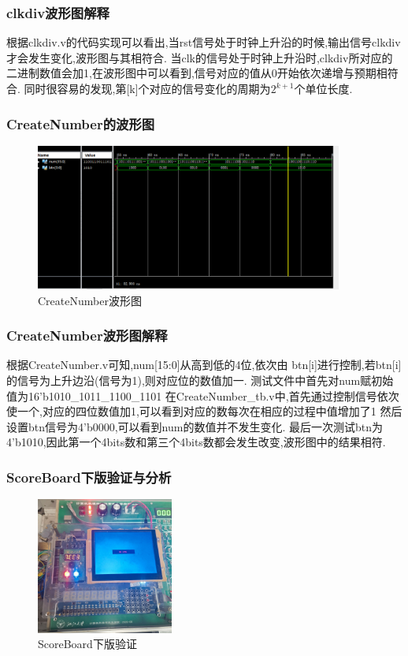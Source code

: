 \documentclass{article}
\begin{document}
\subsubsection*{clkdiv波形图解释}
根据clkdiv.v的代码实现可以看出,当rst信号处于时钟上升沿的时候,输出信号clkdiv才会发生变化,波形图与其相符合.
当clk的信号处于时钟上升沿时,clkdiv所对应的二进制数值会加1,在波形图中可以看到,信号对应的值从0开始依次递增与预期相符合.
同时很容易的发现,第[k]个对应的信号变化的周期为$2^{k+1}$个单位长度.

\subsubsection{CreateNumber的波形图}
    \begin{figure}[H]
    \centering
    \includegraphics[width=0.9\textwidth]{lab7/8.png}
    \caption{\label{Lab7}CreateNumber波形图}
    \end{figure}

\subsubsection*{CreateNumber波形图解释}
根据CreateNumber.v可知,num[15:0]从高到低的4位,依次由 btn[i]进行控制,若btn[i]的信号为上升边沿(信号为1),则对应位的数值加一.
测试文件中首先对num赋初始值为16'b1010\_1011\_1100\_1101
在CreateNumber\_tb.v中,首先通过控制信号依次使一个,对应的四位数值加1,可以看到对应的数每次在相应的过程中值增加了1
然后设置btn信号为4'b0000,可以看到num的数值并不发生变化.
最后一次测试btn为4'b1010,因此第一个4bits数和第三个4bits数都会发生改变,波形图中的结果相符.

\subsubsection{ScoreBoard下版验证与分析}

    \begin{figure}[H]
    \centering
    \includegraphics[width=0.4\textwidth]{lab7/9.jpg}
    \caption{\label{Lab7}ScoreBoard下版验证}
    \end{figure}
\end{document}
